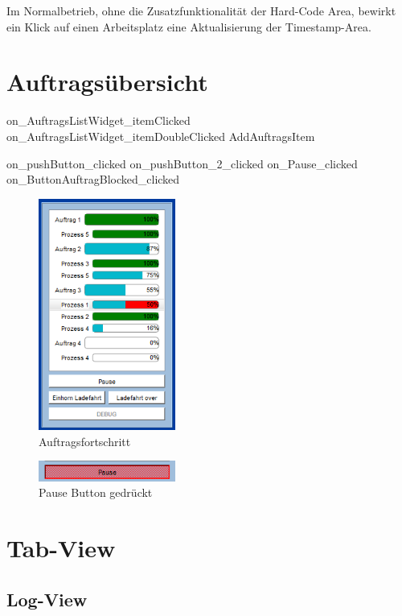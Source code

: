 Im Normalbetrieb, ohne die Zusatzfunktionalität der Hard-Code Area, bewirkt ein Klick auf einen Arbeitsplatz eine Aktualisierung der Timestamp-Area. 

\section{Auftragsübersicht}
\label{sec:Auftragsuebersicht}
on_AuftragsListWidget_itemClicked
on_AuftragsListWidget_itemDoubleClicked
AddAuftragsItem

on_pushButton_clicked
on_pushButton_2_clicked
on_Pause_clicked
on_ButtonAuftragBlocked_clicked

\begin{figure}[htb]
    \centering
    \includegraphics[width=0.4\textwidth]{Abbildungen/Auftragsfortschritt.png}
    \caption{Auftragsfortschritt}		
    \label{fig:Auftragsfortschritt}
\end{figure}

\begin{figure}[htb]
    \centering
    \includegraphics[width=0.4\textwidth]{Abbildungen/Pause.png}
    \caption{Pause Button gedrückt}		
    \label{fig:Pause}
\end{figure}

\section{Tab-View}

\subsection{Log-View}


